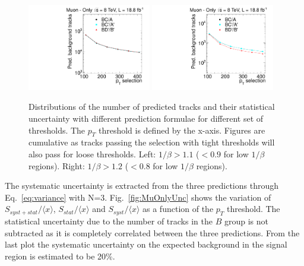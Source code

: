 \begin{figure}
\begin{center}
\includegraphics[clip=false, trim=0.0cm 0cm 0.0cm 0cm, width=0.48\textwidth]{figures/muonly/Data8TeVCollisionPrediction_TOF110}
\includegraphics[clip=false, trim=0.0cm 0cm 0.0cm 0cm, width=0.48\textwidth]{figures/muonly/Data8TeVCollisionPrediction_TOF120}
\caption[Distributions of the number of predicted tracks with different prediction formulae for different sets of thresholds in the \muononly\ analysis.]
{Distributions of the number of predicted tracks and their statistical uncertainty with different prediction formulae for different set of thresholds.
The $p_{T}$ threshold is defined by the x-axis.
Figures are cumulative as tracks passing the selection with tight thresholds will also pass for loose thresholds.
Left: $1/\beta>1.1$ ($<0.9$ for low $1/\beta$ regions). Right: $1/\beta>1.2$ ($<0.8$ for low $1/\beta$ regions).}
\label{fig:MuOnlycorrelation}
\end{center}
\end{figure}

The systematic uncertainty is extracted from the three predictions
through Eq.~\ref{eq:variance} with N=3.
Fig.~\ref{fig:MuOnlyUnc} shows the variation of
$S_{syst+stat}/\langle x \rangle $, $S_{stat}/ \langle x \rangle $ and $S_{syst}/ \langle x \rangle $
as a function of the $p_T$ threshold. The statistical uncertainty due to the number of tracks in the $B$ group is not subtracted as it is completely correlated
between the three predictions. From the last plot
the systematic uncertainty on the expected background in the signal
region is estimated to be 20\%.

